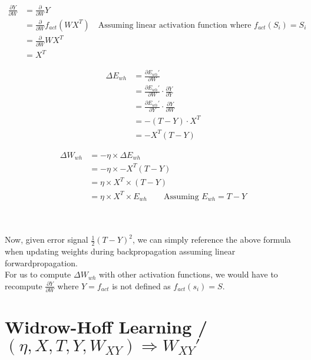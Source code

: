 \documentclass[12 pt]{article}
\begin{document}
	\begin{align*}
		\frac{\partial Y}{\partial W} &= \frac{\partial}{\partial W} Y\\
		&= \frac{\partial}{\partial W} f_{act}(WX^T) \quad\text{Assuming linear activation function where } f_{act}(S_i) = S_i\\
		&= \frac{\partial}{\partial W} WX^T\\
		&= X^T
	\end{align*}\begin{minipage}{0.45\textwidth}
		\begin{align*}
			\Delta E_{wh} &= \frac{\partial E_{wh}'}{\partial W}\\
			&= \frac{\partial E_{wh}'}{\partial W} \cdot \frac{\partial Y}{\partial Y}\\
			&= \frac{\partial E_{wh}'}{\partial Y} \cdot \frac{\partial Y}{\partial W}\\
			&= -(T - Y) \cdot X^T\\
			&= -X^T(T - Y)
		\end{align*}	
	\end{minipage}\begin{minipage}{0.45\textwidth}
		\begin{align*}
			\Delta W_{wh} &= - \eta \times \Delta E_{wh}\\
			&= -\eta \times -X^T(T - Y)\\
			&= \eta \times X^T \times (T - Y)\\
			&= \eta \times X^T \times E_{wh} \quad\quad\text{Assuming $E_{wh} = T - Y$}
		\end{align*}
	\end{minipage}
	
	\hspace{1em}\\\\Now, given error signal $\frac{1}{2}(T - Y)^2$, we can simply reference the above formula when updating weights during backpropagation assuming linear forwardpropagation.\\

	For us to compute $\Delta W_{wh}$ with other activation functions, we would have to recompute $\frac{\partial Y}{\partial W}$ where $Y = f_{act}$ is not defined as $f_{act}(s_i) = S$.

\newpage\thispagestyle{empty}
\section*{Widrow-Hoff Learning / $(\eta, X, T, Y, W_{XY}) \Rightarrow W_{XY}'$}
\end{document}
